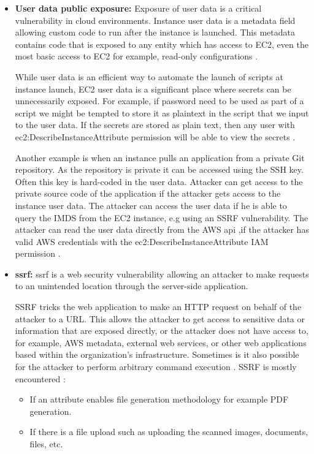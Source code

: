 \begin{itemize}
    \item \textbf{User data public exposure:} Exposure of user data is a critical vulnerability in cloud environments.
    Instance user data is a metadata field allowing custom code to run after the instance is launched.
    This metadata
    contains code that is exposed to any entity which has access to EC2, even the most basic access to EC2 for
    example, read-only configurations \cite{48}.

    While user data is an efficient way to automate the launch of scripts at instance launch, EC2 user data is a
    significant place where secrets can be unnecessarily exposed.
    For example, if password need to be used as part of
    a script we might be tempted to store it as plaintext in the script that we input to the user data.
    If the secrets are stored as plain text, then any user with ec2:DescribeInstanceAttribute permission will be able to view the secrets \cite{59}.

    Another example is when an instance pulls an application from a private Git repository.
    As the repository is
    private it can be accessed using the SSH key.
    Often this key is hard-coded in the user data.
    Attacker can get
    access to the private source code of the application if the attacker gets access to the instance user data.
    The attacker can access the user data if he is able to query the IMDS from the EC2 instance, e.g using an SSRF
    vulnerability.
    The attacker can read the user data directly from the
    AWS \gls{api} ,if the attacker has valid AWS
    credentials with the ec2:DescribeInstanceAttribute
    IAM permission \cite{60}.
\end{itemize}

\begin{itemize}
    \item \textbf{\gls{ssrf}:} \gls{ssrf} is a web security
    vulnerability allowing an attacker to make requests to an unintended location through the server-side application.

    SSRF tricks the web application to make an HTTP request on behalf of the attacker to a URL. This allows the
    attacker to get access to sensitive data or information that are exposed directly, or the attacker does not have
    access to, for example, AWS metadata, external web services, or other web applications based within the
    organization’s infrastructure.
    Sometimes is it also possible for the attacker to perform arbitrary command
    execution \cite{61}.
    SSRF is mostly encountered \cite{62}:
    \begin{itemize}
        \item If an attribute enables file generation methodology for example PDF generation.
    \end{itemize}
    \begin{itemize}
        \item If there is a file upload such as uploading the scanned images, documents, files, etc.
    \end{itemize}
\end{itemize}

